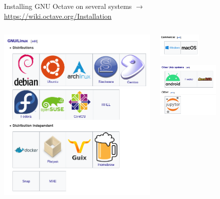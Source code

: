 \begin{frame}{Installing GNU Octave on several systems}
$\rightarrow$ \url{https://wiki.octave.org/Installation}
\bigskip
\begin{columns}
\begin{column}{0.4\textwidth}
\includegraphics[width=\textwidth]{res/images/octave_wiki_install_linux}
\end{column}
\begin{column}{0.4\textwidth}
\includegraphics[width=0.42\textwidth]{res/images/octave_wiki_install_commercial}

\includegraphics[width=0.6\textwidth]{res/images/octave_wiki_install_other}
\bigskip\bigskip\bigskip
\end{column}
\end{columns}

\end{frame}
